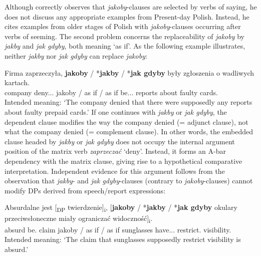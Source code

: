 \documentclass[output=paper
,modfonts
,nonflat]{langsci/langscibook}
\begin{document}
\noindent Although \textcite{Taborek2008} correctly observes that \emph{jakoby}-clauses are selected by verbs of saying, he does not discuss any appropriate examples from Present-day Polish. Instead, he cites examples from older stages of Polish with  \emph{jakoby}-clauses occurring after verbs of seeming. The second problem concerns the replaceability of \emph{jakoby} by  \emph{jakby} and \emph{jak gdyby}, both meaning `as if'. As the following example illustrates, neither \emph{jakby} nor \emph{jak gdyby} can replace \emph{jakoby}:  

\ea \gll Firma zaprzeczyła, \textbf{jakoby} / *\textbf{jakby} / *\textbf{jak gdyby} były zgłoszenia o wadliwych kartach. \label{Taborek2} \\
		company deny.{\lptcp}.{\sg}.{\fem} jakoby / {as if} / {as if} be.{\lptcp}.{\nvir}.{\pl} reports about faulty cards.{\loc} \\
\glt	Intended meaning: `The company denied that there were supposedly any reports about faulty prepaid cards.' 
\z
If one continues  with \emph{jakby} or \emph{jak gdyby}, the dependent clause modifies the way the company denied (= adjunct clause), not what the company denied (= complement clause). In other words, the embedded clause headed by \emph{jakby} or \emph{jak gdyby} does not occupy the internal argument position of the matrix verb \emph{zaprzeczać} `deny'. Instead, it forms an A-bar dependency with the matrix clause, giving rise to a hypothetical comparative interpretation. Independent evidence for this argument follows from the observation that \emph{jakby}- and \emph{jak gdyby}-clauses (contrary to \emph{jakoby}-clauses) cannot modify DPs derived from speech\slash report expressions:

\ea \gll Absurdalne jest [\textsubscript{DP} twierdzenie]\textsubscript{i}, [\textbf{jakoby} / *\textbf{jakby} / *\textbf{jak gdyby}  {okulary przeciwsłoneczne} miały ograniczać widoczność]\textsubscript{i}. \\ 
		absurd be.{\thirdperson}{\sg} {} claim jakoby / {as if} / {as if} sunglasses have.{\lptcp}.{\nvir}.{\pl}  restrict.{\infv} visibility.{\acc} \\
\glt	Intended meaning: `The claim that  sunglasses supposedly restrict visibility is absurd.'    
\z
\end{document}
